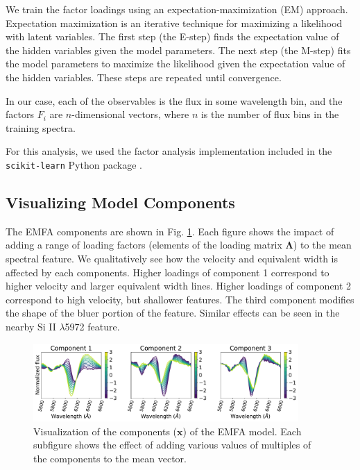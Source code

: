 We train the factor loadings using an expectation-maximization (EM) approach. Expectation maximization is an iterative technique for maximizing a likelihood with latent variables. The first step (the E-step) finds the expectation value of the hidden variables given the model parameters. The next step (the M-step) fits the model parameters to maximize the likelihood given the expectation value of the hidden variables. These steps are repeated until convergence.

In our case, each of the observables is the flux in some wavelength bin, and the factors $F_i$ are $n$-dimensional vectors, where $n$ is the number of flux bins in the training spectra.

For this analysis, we used the factor analysis implementation included in the \verb|scikit-learn| Python package \citep{pedregosa_scikit-learn_2011}.

\subsection{Visualizing Model Components}
The EMFA components are shown in Fig. \ref{emfa_components}. Each figure shows the impact of adding a range of loading factors (elements of the loading matrix $\bm{\Lambda}$) to the mean spectral feature. We qualitatively see how the velocity and equivalent width is affected by each components. Higher loadings of component 1 correspond to higher velocity and larger equivalent width lines. Higher loadings of component 2 correspond to high velocity, but shallower features. The third component modifies the shape of the bluer portion of the feature. Similar effects can be seen in the nearby Si II $\lambda$5972 feature.

\begin{figure}[htbp]
    \centering
    \includegraphics[width=0.9\textwidth]{figures/si_feat_pca/model_components.pdf}
    \caption{Visualization of the components ($\bm{x}$) of the EMFA model. Each subfigure shows the effect of adding various values of multiples of the components to the mean vector.}
    \label{emfa_components}
\end{figure}

